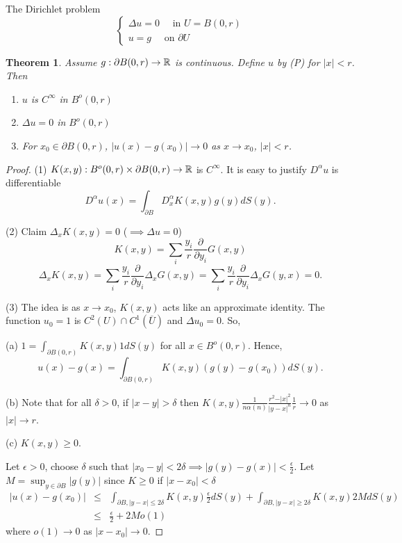 \documentclass[11pt]{amsart}%
\newtheorem{theorem}{Theorem}
\begin{document}
The Dirichlet problem
$$\begin{cases}
    \Delta u =0 \quad \text{ in } U=B(0,r)\\
    u=g \quad \text{ on } \partial U
\end{cases}$$

\begin{theorem}
    Assume $g:\partial B(0,r)\to \mathbb{R}$ is continuous. Define $u$ by (P) for $\vert x\vert <r$. Then
    \begin{enumerate}
        \item $u$ is $C^\infty$ in $B^o(0,r)$
        \item $\Delta u =0$ in $B^o(0,r)$
        \item For $x_0\in \partial B(0,r)$, $\vert u(x)-g(x_0)\vert \to 0$ as $x\to x_0$, $\vert x\vert <r$.
    \end{enumerate}
\end{theorem}

\begin{proof}
(1) $K(x,y):B^o(0,r)\times \partial B(0,r) \to \mathbb{R}$ is $C^\infty$. It is easy to justify $D^\alpha u$ is differentiable
$$D^\alpha u(x) =\int_{\partial B} D^\alpha_x K(x,y)g(y)dS(y).$$

(2) Claim $\Delta_x K(x,y) =0$ ($\implies \Delta u=0$)
$$K(x,y) = \sum_{i}\frac{y_i}{r}\frac{\partial}{\partial y_i} G(x,y)$$
$$\Delta_x K(x,y) = \sum_{i}\frac{y_i}{r}\frac{\partial}{\partial y_i} \Delta_x G(x,y)= \sum_{i}\frac{y_i}{r}\frac{\partial}{\partial y_i} \Delta_x G(y,x)=0.$$

(3) The idea is as $x\to x_0$, $K(x,y)$ acts like an approximate identity. The function $u_0=1$ is $C^2(U)\cap C^1(\overline{U})$ and $\Delta u_0 =0$. So,

(a) $1=\int_{\partial B(0,r)} K(x,y)1 dS(y)$ for all $x\in B^o(0,r)$. Hence,
$$u(x)-g(x)=\int_{\partial B(0,r)} K(x,y)(g(y)-g(x_0))dS(y).$$

(b) Note that for all $\delta >0$, if $\vert x-y\vert >\delta$ then $K(x,y)\frac{1}{n\alpha(n)}\frac{r^2-\vert x\vert^2}{\vert y-x\vert^n}\frac{1}{r} \to 0$ as $\vert x\vert \to r$.

(c) $K(x,y)\ge 0$.

Let $\epsilon >0$, choose $\delta$ such that $\vert x_0 -y\vert <2\delta \implies \vert g(y)-g(x)\vert <\frac{\epsilon}{2}$. Let $M=\sup_{y\in\partial B}\vert g(y)\vert$ since $K\ge 0$ if $\vert x-x_0\vert <\delta$
\begin{eqnarray*}
    \vert u(x) -g(x_0)\vert &\le& \int_{\partial B, \vert y-x\vert \le 2\delta} K(x,y)\frac{\epsilon}{2}dS(y) + \int_{\partial B, \vert y-x\vert \ge 2\delta} K(x,y)2M dS(y)\\
        &\le& \frac{\epsilon}{2}+2M o(1)
\end{eqnarray*}
where $o(1)\to 0$ as $\vert x-x_0\vert\to0$.
\end{proof}
\end{document}
